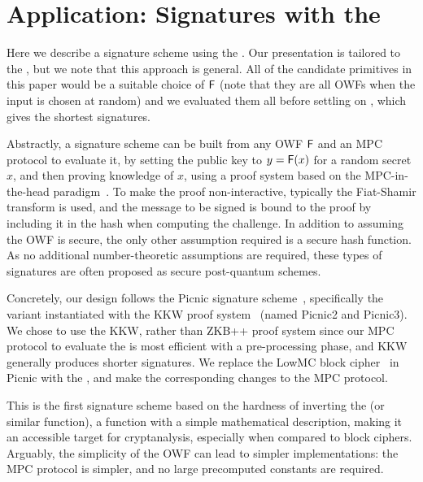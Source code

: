 
\newcommand{\secpar}{\lambda}
\newcommand{\bmat}[1]{\ensuremath{\mathbf{#1}}}
\newcommand{\matA}{\bmat{A}}
\newcommand{\matB}{\bmat{B}}

\section{Application: Signatures with the \ttOWF}
\label{sec:applications}

Here we describe a signature scheme using the \ttOWF. Our presentation is tailored to the \ttOWF, but we note that this approach is general.  All of the candidate primitives in this paper would be a suitable choice of $\mathsf{F}$ (note that they are all OWFs when the input is chosen at random) and we evaluated them all before settling on \ttOWF, which gives the shortest signatures.

Abstractly, a signature scheme can be built from any OWF $\mathsf{F}$ and an MPC protocol to evaluate it, by setting the public key to $y = \mathsf{F}(x)$ for a random secret $x$, and then proving knowledge of $x$, using a proof system based on the MPC-in-the-head paradigm~\cite{ishai2007-zkmpc}. To make the proof non-interactive, typically the Fiat-Shamir transform is used, and the message to be signed is bound to the proof by including it in the hash when computing the challenge. In addition to assuming the OWF is secure, the only other assumption required is a secure hash function. As no additional number-theoretic assumptions are required, these types of signatures are often proposed as secure post-quantum
schemes. 

Concretely, our design follows the Picnic signature scheme~\cite{chase2017-picnic}, specifically the variant instantiated with the KKW proof system~\cite{CCS:KatKolWan18} (named Picnic2 and Picnic3).  We chose to use the KKW, rather than ZKB++ proof system since our MPC protocol to evaluate the \ttOWF is most efficient with a pre-processing phase, and KKW generally produces shorter signatures.  We replace the LowMC block cipher~\cite{albrecht2015-lowmc} in Picnic with the \ttOWF, and make the corresponding changes to the MPC protocol. 

This is the first signature scheme based on the hardness of inverting the \ttOWF (or similar function), a function with a simple mathematical description, making it an accessible target for cryptanalysis, especially when compared to block ciphers.  Arguably, the simplicity of the OWF can lead to simpler implementations: the MPC protocol is simpler, and no large precomputed constants are required. 

